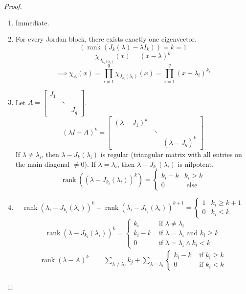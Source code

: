 \documentclass{article}
\numberwithin{lecref}{section}
\DeclareMathOperator{\rank}{rank}
\begin{document}
\begin{proof}
  \begin{enumerate}
    \item Immediate.
    \item For every Jordan block, there exists exactly one eigenvector.
      \[ \left(\rank(J_k(\lambda) - \lambda I_k)\right) = k = 1 \]
      \[ \chi_{J_{k_i(\lambda_i)}}(x) = (x - \lambda)^k \]
      \[ \implies \chi_A(x) = \prod_{i=1}^q \chi_{J_{k_i}(\lambda_i)}(x) = \prod_{i=1}^q (x - \lambda_i)^{k_i} \]
    \item Let $A = \begin{bmatrix} J_1 & & \\ & \ddots & \\ & & J_q \end{bmatrix}$.
      \[ (\lambda I - A)^k = \begin{bmatrix} (\lambda - J_1)^k & & \\ & \ddots & \\ & & (\lambda - J_q)^k \end{bmatrix} \]
      If $\lambda \neq \lambda_i$, then $\lambda - J_k(\lambda_i)$ is regular (triangular matrix with all entries on the main diagonal $\neq 0$).
      If $\lambda = \lambda_i$, then $\lambda - J_{k_i}(\lambda_i)$ is nilpotent.
      \[
        \rank((\lambda - J_{k_i}(\lambda_i))^k) = \begin{cases}
          k_i - k & k_i > k \\
          0 & \text{ else}
        \end{cases}
      \]
    \item
      \[ \rank(\lambda_i - J_{k_i}(\lambda_i))^k - \rank(\lambda_i - J_{k_i}(\lambda_i))^{k+1} = \begin{cases} 1 & k_i \geq k+1 \\ 0 & k_i \leq k \end{cases} \]
      \[
        \rank(\lambda - J_{k_i}(\lambda_i))^k = \begin{cases}
          k_i & \text{ if } \lambda \neq \lambda_i \\
          k_i - k & \text{ if } \lambda = \lambda_i \text{ and } k_i \geq k \\
          0 & \text{ if } \lambda = \lambda_i \land k_i < k
        \end{cases}
      \]
      \begin{align*}
        \rank(\lambda - A)^k &= \sum_{\lambda \neq \lambda_j} k_j + \sum_{\lambda = \lambda_i} \begin{cases} k_i - k & \text{ if } k_i \geq k \\ 0 & \text{ if } k_i < k \end{cases} \\

\end{align*}
\end{enumerate}
\end{proof}
\end{document}
